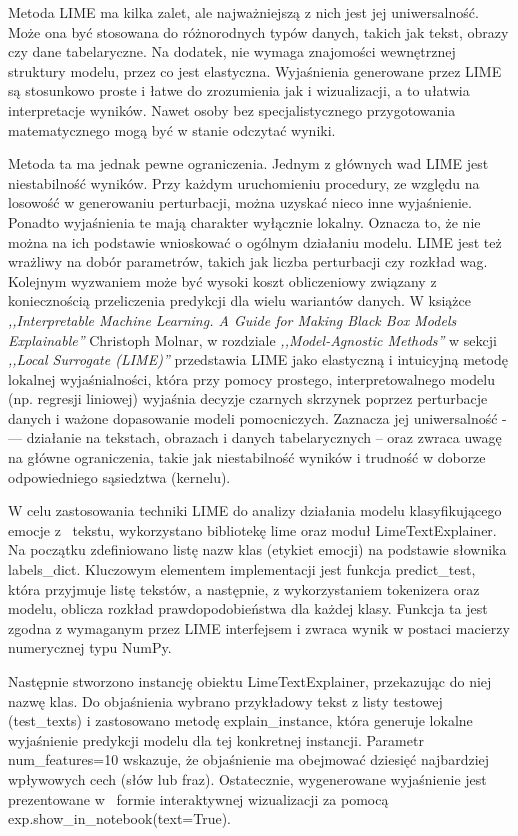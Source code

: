 \documentclass[wmii, inf, mgr]{uwmthesis}
\begin{document}
Metoda LIME ma kilka zalet, ale najważniejszą z nich jest jej uniwersalność. Może ona być stosowana do różnorodnych typów danych, takich jak tekst, obrazy czy dane tabelaryczne. Na dodatek, nie wymaga znajomości wewnętrznej struktury modelu, przez co jest elastyczna. Wyjaśnienia generowane przez LIME są stosunkowo proste i łatwe do zrozumienia jak i wizualizacji, a to ułatwia interpretacje wyników. Nawet osoby bez specjalistycznego przygotowania matematycznego mogą być w stanie odczytać wyniki.

Metoda ta ma jednak pewne ograniczenia. Jednym z głównych wad LIME jest niestabilność wyników. Przy każdym uruchomieniu procedury, ze względu na losowość w generowaniu perturbacji, można uzyskać nieco inne wyjaśnienie. Ponadto wyjaśnienia te mają charakter wyłącznie lokalny. Oznacza to, że nie można na ich podstawie wnioskować o ogólnym działaniu modelu. LIME jest też wrażliwy na dobór parametrów, takich jak liczba perturbacji czy rozkład wag. Kolejnym wyzwaniem może być wysoki koszt obliczeniowy związany z koniecznością przeliczenia predykcji dla wielu wariantów danych. W książce \textit{,,Interpretable Machine Learning. A Guide for Making Black Box Models Explainable''} \cite{SHAP} Christoph Molnar, w rozdziale \textit{,,Model-Agnostic Methods''} w sekcji \textit{,,Local Surrogate (LIME)''} przedstawia LIME jako elastyczną i intuicyjną metodę lokalnej wyjaśnialności, która przy pomocy prostego, interpretowalnego modelu (np. regresji liniowej) wyjaśnia decyzje czarnych skrzynek poprzez perturbacje danych i ważone dopasowanie modeli pomocniczych. Zaznacza jej uniwersalność -— działanie na tekstach, obrazach i danych tabelarycznych -- oraz zwraca uwagę na główne ograniczenia, takie jak niestabilność wyników i trudność w doborze odpowiedniego sąsiedztwa (kernelu).

W celu zastosowania techniki LIME do analizy działania modelu klasyfikującego emocje z~ tekstu, wykorzystano bibliotekę lime oraz moduł LimeTextExplainer. Na początku zdefiniowano listę nazw klas (etykiet emocji) na podstawie słownika labels\_dict. Kluczowym elementem implementacji jest funkcja predict\_test, która przyjmuje listę tekstów, a następnie, z wykorzystaniem tokenizera oraz modelu, oblicza rozkład prawdopodobieństwa dla każdej klasy. Funkcja ta jest zgodna z wymaganym przez LIME interfejsem i zwraca wynik w postaci macierzy numerycznej typu NumPy.

Następnie stworzono instancję obiektu LimeTextExplainer, przekazując do niej nazwę klas. Do objaśnienia wybrano przykładowy tekst z listy testowej (test\_texts) i zastosowano metodę explain\_instance, która generuje lokalne wyjaśnienie predykcji modelu dla tej konkretnej instancji. Parametr num\_features=10 wskazuje, że objaśnienie ma obejmować dziesięć najbardziej wpływowych cech (słów lub fraz). Ostatecznie, wygenerowane wyjaśnienie jest prezentowane w~ formie interaktywnej wizualizacji za pomocą exp.show\_in\_notebook(text=True).
\end{document}
